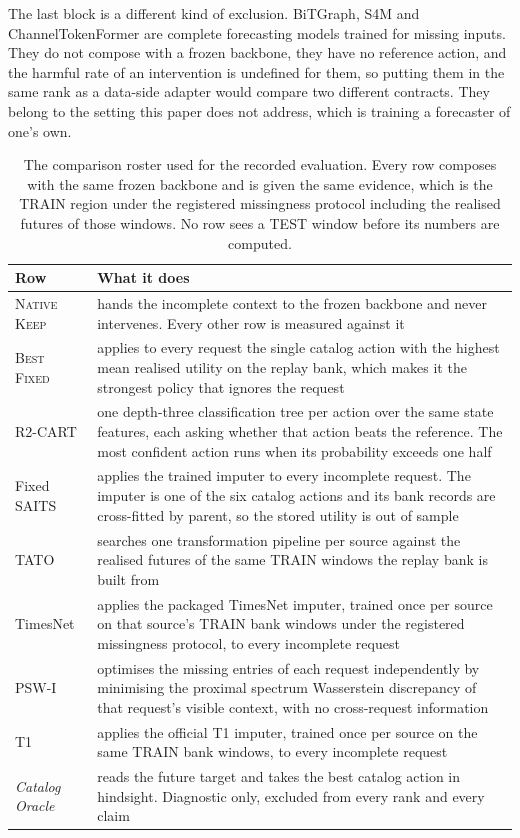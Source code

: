 \documentclass{article}
\begin{document}
The last block is a different kind of exclusion. BiTGraph, S4M and ChannelTokenFormer are
complete forecasting models trained for missing inputs. They do not compose with a frozen
backbone, they have no reference action, and the harmful rate of an intervention is undefined
for them, so putting them in the same rank as a data-side adapter would compare two different
contracts. They belong to the setting this paper does not address, which is training a
forecaster of one's own.

\begin{table}[htbp]
  \caption{The comparison roster used for the recorded evaluation. Every row composes with
  the same frozen backbone and is given the same evidence, which is the TRAIN region under the
  registered missingness protocol including the realised futures of those windows. No row sees
  a TEST window before its numbers are computed.}
  \label{tab:app-roster}
  \centering
  \small
  \setlength{\tabcolsep}{4pt}
\begin{tabular}{@{}l p{}@{}}
    \toprule
    Row & What it does \\
    \midrule
    \textsc{Native Keep} & hands the incomplete context to the frozen backbone and never intervenes. Every other row is measured against it \\
    \textsc{Best Fixed} & applies to every request the single catalog action with the highest mean realised utility on the replay bank, which makes it the strongest policy that ignores the request \\
    R2-CART & one depth-three classification tree per action over the same state features, each asking whether that action beats the reference. The most confident action runs when its probability exceeds one half \\
    Fixed SAITS & applies the trained imputer to every incomplete request. The imputer is one of the six catalog actions and its bank records are cross-fitted by parent, so the stored utility is out of sample \\
    TATO & searches one transformation pipeline per source against the realised futures of the same TRAIN windows the replay bank is built from \\
    TimesNet & applies the packaged TimesNet imputer, trained once per source on that source's TRAIN bank windows under the registered missingness protocol, to every incomplete request \\
    PSW-I & optimises the missing entries of each request independently by minimising the proximal spectrum Wasserstein discrepancy of that request's visible context, with no cross-request information \\
    T1 & applies the official T1 imputer, trained once per source on the same TRAIN bank windows, to every incomplete request \\
    \emph{Catalog Oracle} & reads the future target and takes the best catalog action in hindsight. Diagnostic only, excluded from every rank and every claim \\
    \bottomrule
  \end{tabular}
\end{table}
\end{document}
